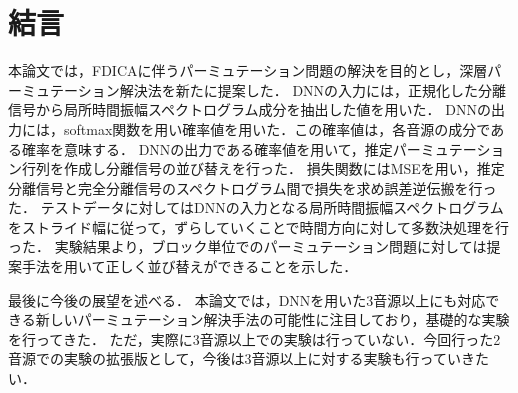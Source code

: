 \chapter{結言}
\label{chap:con}

本論文では，FDICAに伴うパーミュテーション問題の解決を目的とし，深層パーミュテーション解決法を新たに提案した．
DNNの入力には，正規化した分離信号から局所時間振幅スペクトログラム成分を抽出した値を用いた．
DNNの出力には，softmax関数を用い確率値を用いた．この確率値は，各音源の成分である確率を意味する．
DNNの出力である確率値を用いて，推定パーミュテーション行列を作成し分離信号の並び替えを行った．
損失関数にはMSEを用い，推定分離信号と完全分離信号のスペクトログラム間で損失を求め誤差逆伝搬を行った．
テストデータに対してはDNNの入力となる局所時間振幅スペクトログラムをストライド幅に従って，ずらしていくことで時間方向に対して多数決処理を行った．
実験結果より，ブロック単位でのパーミュテーション問題に対しては提案手法を用いて正しく並び替えができることを示した．

最後に今後の展望を述べる．
本論文では，DNNを用いた3音源以上にも対応できる新しいパーミュテーション解決手法の可能性に注目しており，基礎的な実験を行ってきた．
ただ，実際に3音源以上での実験は行っていない．今回行った2音源での実験の拡張版として，今後は3音源以上に対する実験も行っていきたい．
